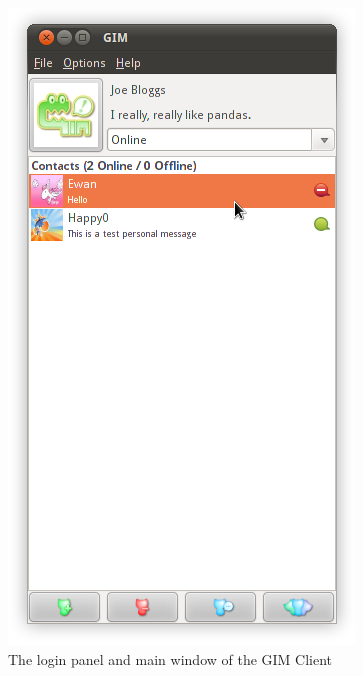 \begin{figure}
\begin{center}
        \includegraphics[scale=0.6]{Implementation/diagrams/main.png}
        \caption{The login panel and main window of the GIM Client}
        \label{MainWindowDia}
    \end{center}
\end{figure}

